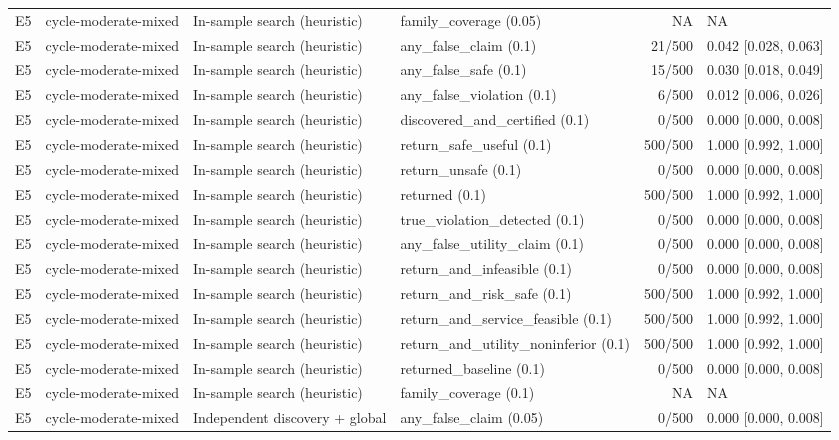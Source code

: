 \begin{longtable}{p{.04\linewidth}p{.18\linewidth}p{.19\linewidth}p{.16\linewidth}r p{.21\linewidth}}
E5 & cycle-moderate-mixed & In-sample search (heuristic) & family\_coverage (0.05) & NA & NA\\
E5 & cycle-moderate-mixed & In-sample search (heuristic) & any\_false\_claim (0.1) & 21/500 & 0.042 [0.028, 0.063]\\
E5 & cycle-moderate-mixed & In-sample search (heuristic) & any\_false\_safe (0.1) & 15/500 & 0.030 [0.018, 0.049]\\
E5 & cycle-moderate-mixed & In-sample search (heuristic) & any\_false\_violation (0.1) & 6/500 & 0.012 [0.006, 0.026]\\
E5 & cycle-moderate-mixed & In-sample search (heuristic) & discovered\_and\_certified (0.1) & 0/500 & 0.000 [0.000, 0.008]\\
E5 & cycle-moderate-mixed & In-sample search (heuristic) & return\_safe\_useful (0.1) & 500/500 & 1.000 [0.992, 1.000]\\
E5 & cycle-moderate-mixed & In-sample search (heuristic) & return\_unsafe (0.1) & 0/500 & 0.000 [0.000, 0.008]\\
E5 & cycle-moderate-mixed & In-sample search (heuristic) & returned (0.1) & 500/500 & 1.000 [0.992, 1.000]\\
E5 & cycle-moderate-mixed & In-sample search (heuristic) & true\_violation\_detected (0.1) & 0/500 & 0.000 [0.000, 0.008]\\
E5 & cycle-moderate-mixed & In-sample search (heuristic) & any\_false\_utility\_claim (0.1) & 0/500 & 0.000 [0.000, 0.008]\\
E5 & cycle-moderate-mixed & In-sample search (heuristic) & return\_and\_infeasible (0.1) & 0/500 & 0.000 [0.000, 0.008]\\
E5 & cycle-moderate-mixed & In-sample search (heuristic) & return\_and\_risk\_safe (0.1) & 500/500 & 1.000 [0.992, 1.000]\\
E5 & cycle-moderate-mixed & In-sample search (heuristic) & return\_and\_service\_feasible (0.1) & 500/500 & 1.000 [0.992, 1.000]\\
E5 & cycle-moderate-mixed & In-sample search (heuristic) & return\_and\_utility\_noninferior (0.1) & 500/500 & 1.000 [0.992, 1.000]\\
E5 & cycle-moderate-mixed & In-sample search (heuristic) & returned\_baseline (0.1) & 0/500 & 0.000 [0.000, 0.008]\\
E5 & cycle-moderate-mixed & In-sample search (heuristic) & family\_coverage (0.1) & NA & NA\\
E5 & cycle-moderate-mixed & Independent discovery + global & any\_false\_claim (0.05) & 0/500 & 0.000 [0.000, 0.008]\\

\end{longtable}
